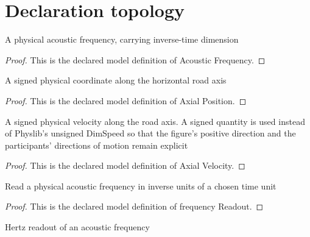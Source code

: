 \section{Declaration topology}
\begin{definition}
  \label{def:physics:phyx-mini-0196:phyxminiproblems-problemphyxmini0196-acousticfrequency}
  A physical acoustic frequency, carrying inverse-time dimension
\end{definition}
\begin{proof}
  This is the declared model definition of Acoustic Frequency.
\end{proof}
\begin{definition}
  \label{def:physics:phyx-mini-0196:phyxminiproblems-problemphyxmini0196-axialposition}
  A signed physical coordinate along the horizontal road axis
\end{definition}
\begin{proof}
  This is the declared model definition of Axial Position.
\end{proof}
\begin{definition}
  \label{def:physics:phyx-mini-0196:phyxminiproblems-problemphyxmini0196-axialvelocity}
  A signed physical velocity along the road axis. A signed quantity is used instead of Physlib's unsigned DimSpeed so that the figure's positive direction and the participants' directions of motion remain explicit
\end{definition}
\begin{proof}
  This is the declared model definition of Axial Velocity.
\end{proof}
\begin{definition}
  \label{def:physics:phyx-mini-0196:phyxminiproblems-problemphyxmini0196-frequencyreadout}
  Read a physical acoustic frequency in inverse units of a chosen time unit
\end{definition}
\begin{proof}
  This is the declared model definition of frequency Readout.
\end{proof}
\begin{definition}
  \label{def:physics:phyx-mini-0196:phyxminiproblems-problemphyxmini0196-frequencyinhertz}
  Hertz readout of an acoustic frequency
\end{definition}
